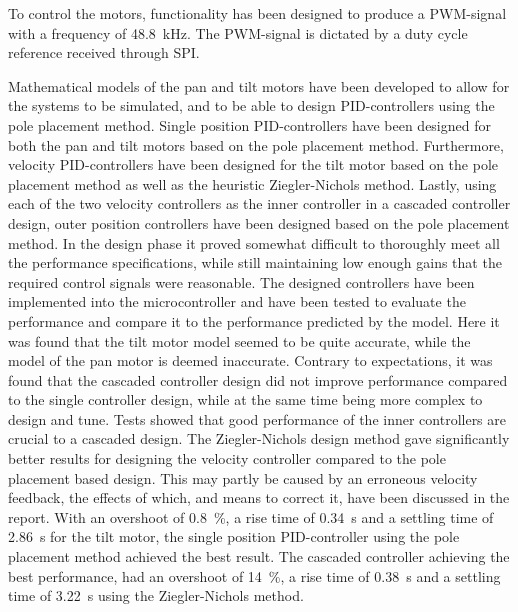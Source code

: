 \documentclass[../../main.tex]{subfiles}
\begin{document}
To control the motors, functionality has been designed to produce a PWM-signal with a frequency of \SI{48.8}{\kilo\hertz}. The PWM-signal is dictated by a duty cycle reference received through SPI.

Mathematical models of the pan and tilt motors have been developed to allow for the systems to be simulated, and to be able to design PID-controllers using the pole placement method.
Single position PID-controllers have been designed for both the pan and tilt motors based on the pole placement method. Furthermore, velocity PID-controllers have been designed for the tilt motor based on the pole placement method as well as the heuristic Ziegler-Nichols method. Lastly, using each of the two velocity controllers as the inner controller in a cascaded controller design, outer position controllers have been designed based on the pole placement method. In the design phase it proved somewhat difficult to thoroughly meet all the performance specifications, while still maintaining low enough gains that the required control signals were reasonable.
The designed controllers have been implemented into the microcontroller and have been tested to evaluate the performance and compare it to the performance predicted by the model.
Here it was found that the tilt motor model seemed to be quite accurate, while the model of the pan motor is deemed inaccurate.
Contrary to expectations, it was found that the cascaded controller design did not improve performance compared to the single controller design, while at the same time being more complex to design and tune.
Tests showed that good performance of the inner controllers are crucial to a cascaded design. The Ziegler-Nichols design method gave significantly better results for designing the velocity controller compared to the pole placement based design. This may partly be caused by an erroneous velocity feedback, the effects of which, and means to correct it, have been discussed in the report.
With an overshoot of \SI{0,8}{\percent}, a rise time of \SI{0,34}{\second} and a settling time of \SI{2,86}{\second} for the tilt motor, the single position PID-controller using the pole placement method achieved the best result.
The cascaded controller achieving the best performance, had an overshoot of \SI{14}{\percent}, a rise time of \SI{0,38}{\second} and a settling time of \SI{3,22}{\second} using the Ziegler-Nichols method. 
\end{document}
